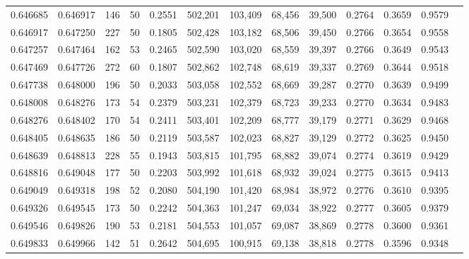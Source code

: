 \begin{tabular}{rrrrrrrrrrrrr}
0.646685 & 0.646917 &   146 &  50 &                                     0.2551 & 502,201 & 103,409 &  68,456 &  39,500 & 0.2764 & 0.3659 & 0.9579 \\
0.646917 & 0.647250 &   227 &  50 &                                     0.1805 & 502,428 & 103,182 &  68,506 &  39,450 & 0.2766 & 0.3654 & 0.9558 \\
0.647257 & 0.647464 &   162 &  53 &                                     0.2465 & 502,590 & 103,020 &  68,559 &  39,397 & 0.2766 & 0.3649 & 0.9543 \\
0.647469 & 0.647726 &   272 &  60 &                                     0.1807 & 502,862 & 102,748 &  68,619 &  39,337 & 0.2769 & 0.3644 & 0.9518 \\
0.647738 & 0.648000 &   196 &  50 &                                     0.2033 & 503,058 & 102,552 &  68,669 &  39,287 & 0.2770 & 0.3639 & 0.9499 \\
0.648008 & 0.648276 &   173 &  54 &                                     0.2379 & 503,231 & 102,379 &  68,723 &  39,233 & 0.2770 & 0.3634 & 0.9483 \\
0.648276 & 0.648402 &   170 &  54 &                                     0.2411 & 503,401 & 102,209 &  68,777 &  39,179 & 0.2771 & 0.3629 & 0.9468 \\
0.648405 & 0.648635 &   186 &  50 &                                     0.2119 & 503,587 & 102,023 &  68,827 &  39,129 & 0.2772 & 0.3625 & 0.9450 \\
0.648639 & 0.648813 &   228 &  55 &                                     0.1943 & 503,815 & 101,795 &  68,882 &  39,074 & 0.2774 & 0.3619 & 0.9429 \\
0.648816 & 0.649048 &   177 &  50 &                                     0.2203 & 503,992 & 101,618 &  68,932 &  39,024 & 0.2775 & 0.3615 & 0.9413 \\
0.649049 & 0.649318 &   198 &  52 &                                     0.2080 & 504,190 & 101,420 &  68,984 &  38,972 & 0.2776 & 0.3610 & 0.9395 \\
0.649326 & 0.649545 &   173 &  50 &                                     0.2242 & 504,363 & 101,247 &  69,034 &  38,922 & 0.2777 & 0.3605 & 0.9379 \\
0.649546 & 0.649826 &   190 &  53 &                                     0.2181 & 504,553 & 101,057 &  69,087 &  38,869 & 0.2778 & 0.3600 & 0.9361 \\
0.649833 & 0.649966 &   142 &  51 &                                     0.2642 & 504,695 & 100,915 &  69,138 &  38,818 & 0.2778 & 0.3596 & 0.9348 \\

\end{tabular}
